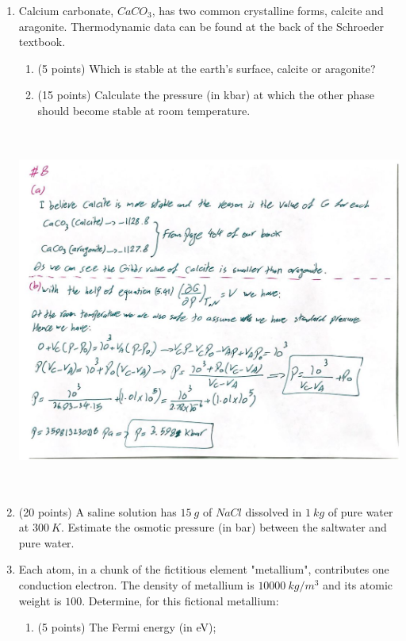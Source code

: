 \documentclass[fleqn]{article}
\begin{document}
\begin{enumerate}
    \pagebreak

    \item Calcium carbonate, $CaCO_3$, has two common crystalline forms, calcite and aragonite. Thermodynamic 
    data can be found at the back of the Schroeder textbook.
    \begin{enumerate}
      \item (5 points) Which is stable at the earth's surface, calcite or aragonite?

      \item (15 points) Calculate the pressure (in kbar) at which the other phase should become stable
      at room temperature.
    \end{enumerate}

    \begin{center}
      \includegraphics[height=12cm, width=15cm]{8.JPG}
    \end{center}

    \pagebreak

    \item (20 points) A saline solution has $15 ~ g$ of $NaCl$ dissolved in $1 ~ kg$ of pure water at $300 ~ K$. Estimate
    the osmotic pressure (in bar) between the saltwater and pure water.

    \pagebreak

    \item Each atom, in a chunk of the fictitious element "metallium", contributes one conduction electron. 
    The density of metallium is $10000 ~ kg/m^3$ and its atomic weight is $100$. Determine, for
    this fictional metallium:
    \begin{enumerate}
      \item (5 points) The Fermi energy (in eV);


\end{enumerate}
\end{enumerate}
\end{document}
